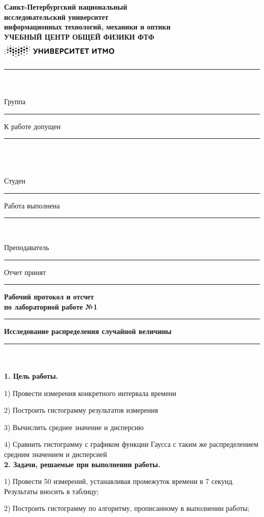 \documentclass[14pt]{article}
\begin{document}
	\begin{center}
		\small \textbf{Санкт-Петербургский национальный} \\\textbf{исследовательский университет} \\
		\textbf{информационных технологий, механики и оптики} \\ 
		\textbf{УЧЕБНЫЙ ЦЕНТР ОБЩЕЙ ФИЗИКИ ФТФ} \\
		\includegraphics{ItmoLogo.png}
	\end{center} 
	\noindent\rule{18.5cm}{3pt} \\ \\
	\large Группа\noindent\rule{7cm}{0.5pt} К работе допущен \noindent\rule{6.5cm}{0.5pt} \\ \\ \\
	Студен \noindent\rule{7cm}{0.5pt} Работа выполнена \noindent\rule{6.5cm}{0.5pt} \\
	\begin{center}
		Преподаватель \noindent\rule{4cm}{0.5pt} Отчет принят \noindent\rule{6.5cm}{0.5pt}
	\end{center} 
	\begin{center}
		\Huge \textbf{Рабочий протокол и отсчет} \\\textbf{по лабораторной работе №1} 
	\end{center}
	\noindent\rule{18.5cm}{2pt}
	\begin{center}
		\textbf{Исследование распределения случайной величины}
	\end{center}
	\noindent\rule{18.5cm}{2pt} \\ \\
	\textbf{1. Цель работы.} 
	\par 1) Провести измерения конкретного интервала времени 
	\par 2) Построить гистограмму результатов измерения 
	\par 3) Вычислить среднее значение и дисперсию 
	\par 4) Сравнить гистограмму с графиком функции Гаусса с таким же распределением средним значением и дисперсией \\
	\textbf{2. Задачи, решаемые при выполнении работы.} 
	\par 1) Провести 50 измерений, устанавливая промежуток времени в 7 секунд. Результаты вносить в таблицу;
	\par 2) Построить гистограмму по алгоритму, прописанному в выполнении работы;
\end{document}
